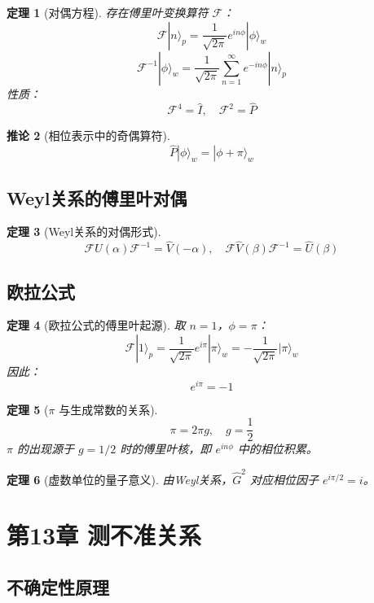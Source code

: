 \documentclass[12pt]{article}
\newtheorem{theorem}{定理}[section]
\newtheorem{corollary}[theorem]{推论}
\theoremstyle{definition}
\begin{document}
\begin{theorem}[对偶方程]
存在傅里叶变换算符 \(\mathcal{F}\)：
\[
\mathcal{F}|n\rangle_p = \frac{1}{\sqrt{2\pi}} e^{in\phi}|\phi\rangle_w
\]
\[
\mathcal{F}^{-1}|\phi\rangle_w = \frac{1}{\sqrt{2\pi}} \sum_{n=1}^{\infty} e^{-in\phi} |n\rangle_p
\]
性质：
\[
\mathcal{F}^4 = \hat{I},\quad \mathcal{F}^2 = \hat{P}
\]
\end{theorem}

\begin{corollary}[相位表示中的奇偶算符]
\[
\hat{P}|\phi\rangle_w = |\phi + \pi\rangle_w
\]
\end{corollary}

\subsection{Weyl关系的傅里叶对偶}

\begin{theorem}[Weyl关系的对偶形式]
\[
\mathcal{F}\hat{U}(\alpha)\mathcal{F}^{-1} = \hat{V}(-\alpha),\quad \mathcal{F}\hat{V}(\beta)\mathcal{F}^{-1} = \hat{U}(\beta)
\]
\end{theorem}

\subsection{欧拉公式}

\begin{theorem}[欧拉公式的傅里叶起源]
取 \(n=1\)，\(\phi = \pi\)：
\[
\mathcal{F}|1\rangle_p = \frac{1}{\sqrt{2\pi}} e^{i\pi}|\pi\rangle_w = -\frac{1}{\sqrt{2\pi}}|\pi\rangle_w
\]
因此：
\[
e^{i\pi} = -1
\]
\end{theorem}

\begin{theorem}[\(\pi\) 与生成常数的关系]
\[
\pi = 2\pi g,\quad g = \frac{1}{2}
\]
\(\pi\) 的出现源于 \(g=1/2\) 时的傅里叶核，即 \(e^{in\phi}\) 中的相位积累。
\end{theorem}

\begin{theorem}[虚数单位的量子意义]
由Weyl关系，\(\hat{G}^2\) 对应相位因子 \(e^{i\pi/2} = i\)。
\end{theorem}

\section{第13章 测不准关系}

\subsection{不确定性原理}
\end{document}
